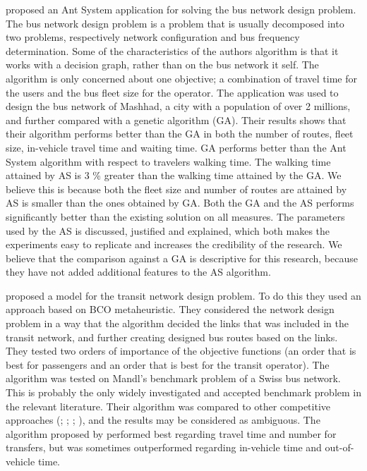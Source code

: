 \citet{poorzahedy11} proposed an Ant System application for solving the bus network design problem. The bus network design problem is a problem that is usually decomposed into two problems, respectively network configuration and bus frequency determination. Some of the characteristics of the authors algorithm is that it works with a decision graph, rather than on the bus network it self. The algorithm is only concerned about one objective; a combination of travel time for the users and the bus fleet size for the operator. The application was used to design the bus network of Mashhad, a city with a population of over 2 millions, and further compared with a genetic algorithm (GA). Their results shows that their algorithm performs better than the GA in both the number of routes, fleet size, in-vehicle travel time and waiting time. GA performs better than the Ant System algorithm with respect to travelers walking time. The walking time attained by AS is 3 \% greater than the walking time attained by the GA. We believe this is because both the fleet size and number of routes are attained by AS is smaller than the ones obtained by GA. Both the GA and the AS performs significantly better than the existing solution on all measures. The parameters used by the AS is discussed, justified and explained, which both makes the experiments easy to replicate and increases the credibility of the research. We believe that the comparison against a GA is descriptive for this research, because they have not added additional features to the AS algorithm. 

\citet{nikolic14} proposed a model for the transit network design problem. To do this they used an approach based on BCO metaheuristic. They considered the network design problem in a way that the algorithm decided the links that was included in the transit network, and further creating designed bus routes based on the links. They tested two orders of importance of the objective functions (an order that is best for passengers and an order that is best for the transit operator). The algorithm was tested on Mandl's benchmark problem of a Swiss bus network\citep{mandl80}. This is probably the only widely investigated and accepted benchmark problem in the relevant literature\citep{kechagiopoulos14}. Their algorithm was compared to other competitive approaches (\citet{mandl80}; \citet{shih94}; \citet{baaj95}; \citet{bagloee11}), and the results may be considered as ambiguous. The algorithm proposed by \citet{nikolic14} performed best regarding travel time and number for transfers, but was sometimes outperformed regarding in-vehicle time and out-of-vehicle time. 

